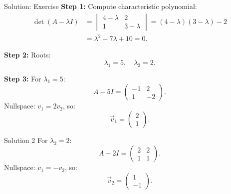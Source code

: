 \documentclass{beamer}
\begin{document}
	\begin{frame}{Solution: Exercise}
	\textbf{Step 1:} Compute characteristic polynomial:
		\begin{align}
		\det(A-\lambda I) &=
		\begin{vmatrix}4-\lambda &2 \\1 &3-\lambda\end{vmatrix} =
		(4-\lambda)(3-\lambda)-2 \\
		&= \lambda^2 -7\lambda+10=0.
		\end{align}

	\textbf{Step 2:} Roots:
		\begin{equation}
		\lambda_1=5, \quad \lambda_2=2.
		\end{equation}

	\textbf{Step 3:} For \(\lambda_1=5\):
		\begin{equation}
		A-5I =
		\begin{pmatrix}-1&2\\1&-2\end{pmatrix}.
		\end{equation}
	Nullspace: \(v_1=2v_2\), so:
		\begin{equation}
		\vec{v}_1 =
		\begin{pmatrix}2\\1\end{pmatrix}.
		\end{equation}
	\end{frame}

	\begin{frame}{Solution 2}
	For \(\lambda_2=2\):
		\begin{equation}
		A-2I =
		\begin{pmatrix}2&2\\1&1\end{pmatrix}.
		\end{equation}
	Nullspace: \(v_1=-v_2\), so:
		\begin{equation}
		\vec{v}_2 =
		\begin{pmatrix}1\\-1\end{pmatrix}.
		\end{equation}
	\end{frame}
\end{document}
